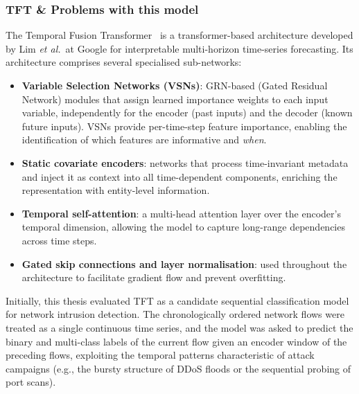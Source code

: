 \documentclass[../main.tex]{subfiles}
\begin{document}
\newpage
\subsubsection{TFT \& Problems with this model}
\label{Chapter: model TFT}

The Temporal Fusion Transformer~\supercite{lim2021temporal} is a transformer-based architecture developed by Lim \emph{et al.}\ at Google for interpretable multi-horizon time-series forecasting.  Its architecture comprises several specialised sub-networks:

\begin{itemize}
    \item \textbf{Variable Selection Networks (VSNs)}: GRN-based (Gated Residual Network) modules that assign learned importance weights to each input variable, independently for the encoder (past inputs) and the decoder (known future inputs).  VSNs provide per-time-step feature importance, enabling the identification of which features are informative and \emph{when}.
    \item \textbf{Static covariate encoders}: networks that process time-invariant metadata and inject it as context into all time-dependent components, enriching the representation with entity-level information.
    \item \textbf{Temporal self-attention}: a multi-head attention layer over the encoder's temporal dimension, allowing the model to capture long-range dependencies across time steps.
    \item \textbf{Gated skip connections and layer normalisation}: used throughout the architecture to facilitate gradient flow and prevent overfitting.
\end{itemize}

Initially, this thesis evaluated TFT as a candidate sequential classification model for network intrusion detection.  The chronologically ordered network flows were treated as a single continuous time series, and the model was asked to predict the binary and multi-class labels of the current flow given an encoder window of the preceding flows, exploiting the temporal patterns characteristic of attack campaigns (e.g., the bursty structure of DDoS floods or the sequential probing of port scans).
\end{document}
